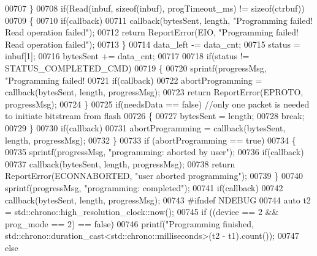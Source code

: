 \begin{DoxyCode}
{{{{{00707         \}
00708         \textcolor{keywordflow}{if}(Read(inbuf, \textcolor{keyword}{sizeof}(inbuf), progTimeout\_ms) != \textcolor{keyword}{sizeof}(ctrbuf))
00709         \{
00710             \textcolor{keywordflow}{if}(callback)
00711                 callback(bytesSent, length, \textcolor{stringliteral}{"Programming failed! Read operation failed"});
00712             \textcolor{keywordflow}{return} ReportError(EIO, \textcolor{stringliteral}{"Programming failed! Read operation failed"});
00713         \}
00714         data\_left -= data\_cnt;
00715         status = inbuf[1];
00716         bytesSent += data\_cnt;
00717 
00718         \textcolor{keywordflow}{if}(status != STATUS_COMPLETED_CMD)
00719         \{
00720             sprintf(progressMsg, \textcolor{stringliteral}{"Programming failed! %
00721             \textcolor{keywordflow}{if}(callback)
00722                 abortProgramming = callback(bytesSent, length, progressMsg);
00723             \textcolor{keywordflow}{return} ReportError(EPROTO, progressMsg);
00724         \}
00725         \textcolor{keywordflow}{if}(needsData == \textcolor{keyword}{false}) \textcolor{comment}{//only one packet is needed to initiate bitstream from flash}
00726         \{
00727             bytesSent = length;
00728             \textcolor{keywordflow}{break};
00729         \}
00730         \textcolor{keywordflow}{if}(callback)
00731             abortProgramming = callback(bytesSent, length, progressMsg);
00732     \}
00733     \textcolor{keywordflow}{if} (abortProgramming == \textcolor{keyword}{true})
00734     \{
00735         sprintf(progressMsg, \textcolor{stringliteral}{"programming: aborted by user"});
00736         \textcolor{keywordflow}{if}(callback)
00737             callback(bytesSent, length, progressMsg);
00738         \textcolor{keywordflow}{return} ReportError(ECONNABORTED, \textcolor{stringliteral}{"user aborted programming"});
00739     \}
00740     sprintf(progressMsg, \textcolor{stringliteral}{"programming: completed"});
00741     \textcolor{keywordflow}{if}(callback)
00742         callback(bytesSent, length, progressMsg);
00743 \textcolor{preprocessor}{#ifndef NDEBUG}
00744     \textcolor{keyword}{auto} t2 = std::chrono::high\_resolution\_clock::now();
00745     \textcolor{keywordflow}{if} ((device == 2 && prog\_mode == 2) == \textcolor{keyword}{false})
00746         printf(\textcolor{stringliteral}{"Programming finished, %
      std::chrono::duration\_cast<std::chrono::milliseconds>(t2 - t1).count());
00747     \textcolor{keywordflow}{else}
}}}}}}}
\end{DoxyCode}
